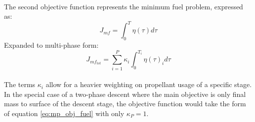 \paragraph{}
The second objective function represents the minimum fuel problem, expressed as:
\begin{equation}
J_{mf} = \int_{0}^{T} \eta(\tau) d\tau
\end{equation}
Expanded to multi-phase form:
\begin{equation} \label{eq:mp_obj_fuel}
J_{mf_{tot}} = \sum_{i=1}^{P} \kappa_i \int_{0}^{T_i} \eta(\tau)_i d\tau
\end{equation}
\paragraph{}
The terms $\kappa_i$ allow for a heavier weighting on propellant usage of a specific stage. In the special case of a two-phase descent where the main objective is only final mass to surface of the descent stage, the objective function would take the form of equation \ref{eq:mp_obj_fuel} with only $\kappa_P = 1$.


























